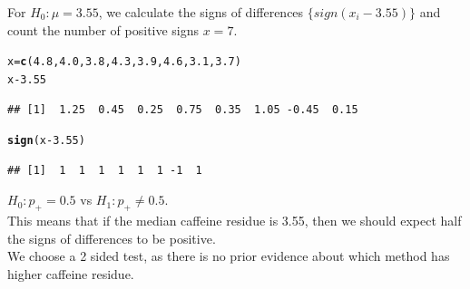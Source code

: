 \documentclass[t,xcolor=pdftex,dvipsnames,table]{beamer}\usepackage[]{graphicx}\usepackage[]{color}
\makeatletter
\newcommand{\hlnum}[1]{\textcolor[rgb]{0.686,0.059,0.569}{#1}}%
\newcommand{\hlopt}[1]{\textcolor[rgb]{0,0,0}{#1}}%
\newcommand{\hlstd}[1]{\textcolor[rgb]{0.345,0.345,0.345}{#1}}%
\newcommand{\hlkwb}[1]{\textcolor[rgb]{0.69,0.353,0.396}{#1}}%
\newcommand{\hlkwd}[1]{\textcolor[rgb]{0.737,0.353,0.396}{\textbf{#1}}}%
\newenvironment{kframe}{%
 \def\at@end@of@kframe{}%
 \ifinner\ifhmode%
  \def\at@end@of@kframe{\end{minipage}}%
  \begin{minipage}{\columnwidth}%
 \fi\fi%
 \def\FrameCommand##1{\hskip\@totalleftmargin \hskip-\fboxsep
 \colorbox{shadecolor}{##1}\hskip-\fboxsep
     \hskip-\linewidth \hskip-\@totalleftmargin \hskip\columnwidth}%
 \MakeFramed {\advance\hsize-\width
   \@totalleftmargin\z@ \linewidth\hsize
   \@setminipage}}%
 {\par\unskip\endMakeFramed%
 \at@end@of@kframe}
\newenvironment{knitrout}{}{} %
\makeatother
\begin{document}
\begin{frame}[fragile]{}

For $H_{0}: \mu = 3.55$, we calculate the signs of differences $\{ sign(x_{i}-3.55) \}$  and count the number of positive signs $x=7$.

\begin{knitrout}
\color{fgcolor}\begin{kframe}
\begin{alltt}
\hlstd{x}\hlkwb{=}\hlkwd{c}\hlstd{(}\hlnum{4.8}\hlstd{,} \hlnum{4.0}\hlstd{,} \hlnum{3.8}\hlstd{,} \hlnum{4.3}\hlstd{,} \hlnum{3.9}\hlstd{,} \hlnum{4.6}\hlstd{,} \hlnum{3.1}\hlstd{,} \hlnum{3.7}\hlstd{)}
\hlstd{x}\hlopt{-}\hlnum{3.55}
\end{alltt}
\begin{verbatim}
## [1]  1.25  0.45  0.25  0.75  0.35  1.05 -0.45  0.15
\end{verbatim}
\begin{alltt}
\hlkwd{sign}\hlstd{(x}\hlopt{-}\hlnum{3.55}\hlstd{)}
\end{alltt}
\begin{verbatim}
## [1]  1  1  1  1  1  1 -1  1
\end{verbatim}
\end{kframe}
\end{knitrout}

\vspace{.5cm}
$H_{0}: p_{+} = 0.5$ vs $H_{1}: p_{+} \neq 0.5$.  \\
This means that if the median caffeine residue is 3.55, then we should expect half the signs of differences to be positive.\\
We choose a 2 sided test, as there is no prior evidence about which method has higher caffeine residue.

\end{frame}
\end{document}

